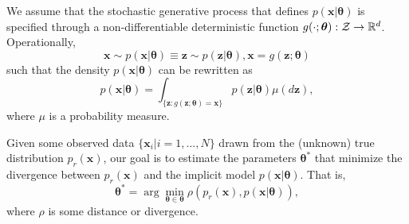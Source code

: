 \documentclass[twocolumn,superscriptaddress,aps]{revtex4-1}
\newcommand{\bftheta}{{\bm \theta}}
\newcommand{\bfx}{\mathbf{x}}
\newcommand{\bfz}{\mathbf{z}}
\theoremstyle{plain}
\begin{document}

We assume that the stochastic generative process that defines $p(\mathbf{x}|\bftheta)$ is
specified through a non-differentiable deterministic function $g(\cdot; \bftheta) : {\cal Z} \to
\mathbb{R}^d$. Operationally, %
\begin{equation}\label{eqn:p_theta}
    \mathbf{x} \sim p(\mathbf{x}|\bftheta) \equiv \bfz \sim p(\bfz|\bftheta), \mathbf{x} = g(\bfz; \bftheta)
\end{equation}
such that the density $p(\mathbf{x}|\bftheta)$ can be 
rewritten as
\begin{equation}\label{eqn:p_x_sim}
    p(\mathbf{x}|\bftheta) = \int_{\{\bfz:g(\bfz;\bftheta) = \bfx \}} p(\bfz|\bftheta) \mu(d\bfz),
\end{equation}
where $\mu$ is a probability measure.

Given some observed data $\{ \mathbf{x}_i | i=1, \dots, N \}$ drawn from the
(unknown) true distribution $p_r(\mathbf{x})$, our goal is to estimate the parameters 
$\bftheta^*$ that minimize the divergence between $p_r(\mathbf{x})$ and
the implicit model $p(\mathbf{x}|\bftheta)$. That is,
\begin{equation}
    \bftheta^* = \arg \min_{\bftheta \in \bftheta} \rho(p_r(\mathbf{x}), p(\mathbf{x}|\bftheta)),
\end{equation}
where $\rho$ is some distance or divergence.


\end{document}
